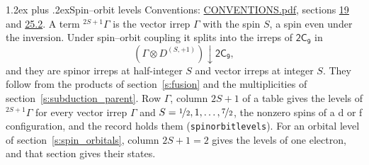\documentclass[10pt,a4paper]{article}
\makeatletter
\renewcommand\section{\@startsection{section}{1}{\z@}{-3ex plus -1ex minus -.2ex}%
  {1.2ex plus .2ex}{\normalfont\large\sffamily\bfseries\color{parttitle}}}
\numberwithin{equation}{section}
\newcommand{\grp}[1]{\mathsf{#1}}
\newcommand{\restr}[2]{#1\!\downarrow#2}
\newcommand{\irrJp}[2]{D^{(#1,#2)}}
\newcommand{\irrprod}{\otimes}
\newcommand{\term}[2]{{}^{#1}#2}
\makeatother
\begin{document}
\section{Spin--orbit levels}\label{s:spin_orbit}
Conventions: \href{../../CONVENTIONS.pdf}{CONVENTIONS.pdf}, sections \href{../../../rotation/CONVENTIONS.pdf\#conv.19}{19} and \href{../../CONVENTIONS.pdf\#conv.25.2}{25.2}.
\leavevmode\label{n:local.spin}\label{n:symbol.term}A term $\term{2S+1}{\Gamma}$ is the vector irrep $\Gamma$ with the spin $S$, a spin even under the inversion. Under spin--orbit coupling it splits into the irreps of $\grp{2C_{9}}$ in
\begin{equation}\label{e:spinorbit}\restr{(\Gamma \irrprod \irrJp{S}{+1})}{\grp{2C_{9}}},\end{equation}
and they are spinor irreps at half-integer $S$ and vector irreps at integer $S$. They follow from the products of section~\ref{s:fusion} and the multiplicities of section~\ref{s:subduction_parent}. Row $\Gamma$, column $2S + 1$ of a table gives the levels of $\term{2S+1}{\Gamma}$ for every vector irrep $\Gamma$ and $S = \nicefrac{1}{2}, 1, \dots, \nicefrac{7}{2}$, the nonzero spins of a d or f configuration, and the record holds them (\texttt{spinorbitlevels}). For an orbital level of section~\ref{s:spin_orbitals}, column $2S + 1 = 2$ gives the levels of one electron, and that section gives their states.
\end{document}
